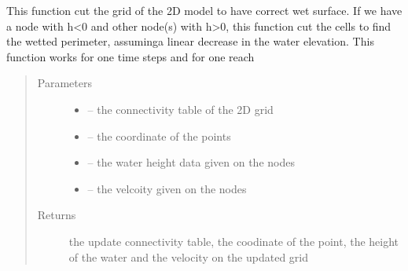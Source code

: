 \documentclass[letterpaper,10pt,english]{sphinxmanual}
\begin{document}
\begin{fulllineitems}
\label{\detokenize{index:src.manage_grid_8.cut_2d_grid}}
This function cut the grid of the 2D model to have correct wet surface. If we have a node with h\textless{}0 and other node(s)
with h\textgreater{}0, this function cut the cells to find the wetted perimeter, assuminga linear decrease in the water elevation.
This function works for one time steps and for one reach
\begin{quote}\begin{description}
\item[{Parameters}] \leavevmode\begin{itemize}
\item {} 
 -- the connectivity table of the 2D grid

\item {} 
 -- the coordinate of the points

\item {} 
 -- the water height data given on the nodes

\item {} 
 -- the velcoity given on the nodes

\end{itemize}

\item[{Returns}] \leavevmode
the update connectivity table, the coodinate of the point, the height of the water and the velocity on the updated grid

\end{description}\end{quote}

\end{fulllineitems}

\end{document}

